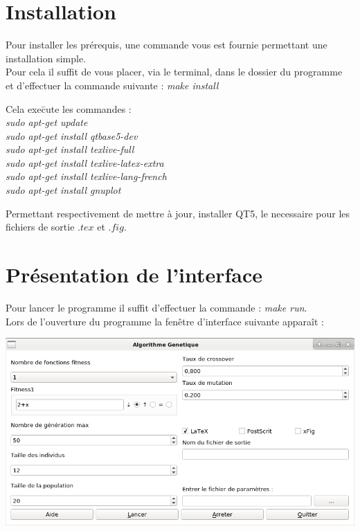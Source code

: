\documentclass[a4paper,11pt]{article}
\title{\vspace{13em}{\huge Manuel d'utilisation}}
\author{Edouard Fouassier - Maxime Gonthier - Benjamin Guillot\\
		Laureline Martin - Rémi Navarro - Lydia Rodrigez de la Nava
		\vspace{2em}\\
		Algorithme Génétique
		\vspace{2em}}
\begin{document}
\clearpage{}
	\maketitle\vspace{13em}
\newpage
\tableofcontents
\newpage\clearpage

\section{Installation}
Pour installer les prérequis, une commande vous est fournie permettant une installation simple.\\
Pour cela il suffit de vous placer, via le terminal, dans le dossier du programme \\
et d'effectuer la commande suivante : \textit{make install}\\
\begin{tabbing}
Cela exe\=cute les commandes :\\
		\>\textit{sudo apt-get update}\\
		\>\textit{sudo apt-get install qtbase5-dev}\\
		\>\textit{sudo apt-get install texlive-full}\\
		\>\textit{sudo apt-get install texlive-latex-extra}\\
		\>\textit{sudo apt-get install texlive-lang-french}\\
		\>\textit{sudo apt-get install gnuplot}\\
\end{tabbing}
Permettant respectivement de mettre à jour, installer QT5, le necessaire pour les fichiers de sortie $.tex$ et $.fig$.\\


\section{Présentation de l'interface}
Pour lancer le programme il suffit d'effectuer la commande : \textit{make run}.\\
Lors de l'ouverture du programme la fenêtre d'interface suivante apparaît :\\
\centerline{\includegraphics[scale = 0.5]{screen1.png}}
\end{document}
